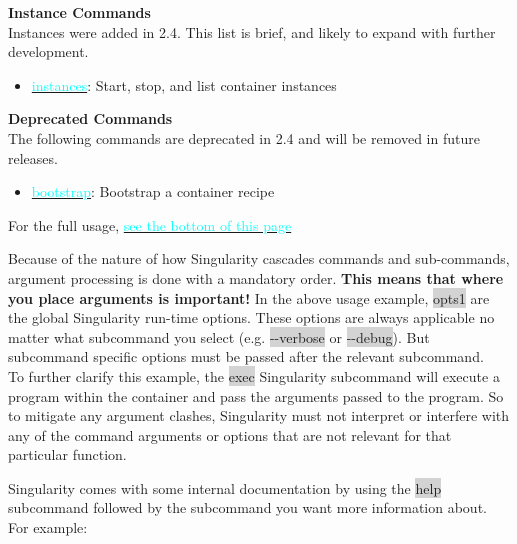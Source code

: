 \documentclass[a4paper]{article}
\newcounter{subsubsubsection}[subsubsection]
\begin{document}
\textbf{Instance Commands}\\[0.1in]

Instances were added in 2.4. This list is brief, and likely to expand with further development.\\[0.1in]

\begin{itemize}
 \item \hyperref[sec:instances]{{\textcolor{cyan}{instances}}}: Start, stop, and list container instances
\end{itemize}

\textbf{Deprecated Commands}\\[0.1in]

The following commands are deprecated in 2.4 and will be removed in future releases.\\[0.1in]

\begin{itemize}
 \item \hyperref[sec:bootstrap]{{\textcolor{cyan}{bootstrap}}}: Bootstrap a container recipe
\end{itemize}

For the full usage, \hyperref[sec:commandsusage]{{\textcolor{cyan}{see the bottom of this page}}}


	Because of the nature of how Singularity cascades commands and sub-commands, argument processing is done with a mandatory order. \textbf{This means that where you place arguments is important!} In the above usage example,  \colorbox{lightgray}{opts1} are the global Singularity run-time options. These options are always applicable no matter what subcommand you select (e.g.  \colorbox{lightgray}{-{}-verbose} or  \colorbox{lightgray}{-{}-debug}). But subcommand specific options must be passed after the relevant subcommand.\\[0.1in]

To further clarify this example, the  \colorbox{lightgray}{exec} Singularity subcommand will execute a program within the container and pass the arguments passed to the program. So to mitigate any argument clashes, Singularity must not interpret or interfere with any of the command arguments or options that are not relevant for that particular function.

	
	Singularity comes with some internal documentation by using the \colorbox{lightgray}{help} subcommand followed by the subcommand you want more information about. For example:
	
\end{document}
